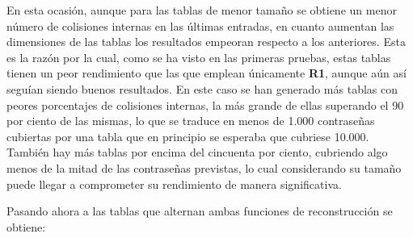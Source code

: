 \documentclass[12pt,spanish,listoffigures,listoftables,listofalgorithms]{tfgetsinf}
\begin{document}
En esta ocasión, aunque para las tablas de menor tamaño se obtiene un menor número de colisiones internas en las últimas entradas, en cuanto aumentan las dimensiones de las tablas los resultados empeoran respecto a los anteriores. Esta es la razón por la cual, como se ha visto en las primeras pruebas, estas tablas tienen un peor rendimiento que las que emplean únicamente \textbf{R1}, aunque aún así seguían siendo buenos resultados. En este caso se han generado más tablas con peores porcentajes de colisiones internas, la más grande de ellas superando el 90 por ciento de las mismas, lo que se traduce en menos de 1.000 contraseñas cubiertas por una tabla que en principio se esperaba que cubriese 10.000. También hay más tablas por encima del cincuenta por ciento, cubriendo algo menos de la mitad de las contraseñas previstas, lo cual considerando su tamaño puede llegar a comprometer su rendimiento de manera significativa.

Pasando ahora a las tablas que alternan ambas funciones de reconstrucción se obtiene:
\end{document}
